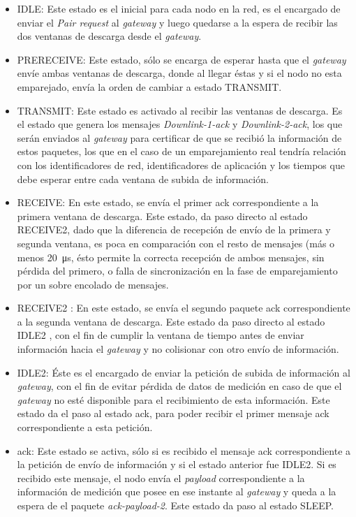 \begin{justify}
\begin{itemize}
\item IDLE: Este estado es el inicial para cada nodo en la red, es el encargado de enviar el \textit{Pair request} al \textit{gateway} y luego quedarse a la espera de recibir las dos ventanas de descarga desde el \textit{gateway}.
\item PRERECEIVE: Este estado, sólo se encarga de esperar hasta que el \textit{gateway} envíe ambas ventanas de descarga, donde al llegar éstas y si el nodo no esta emparejado, envía la orden de cambiar a estado TRANSMIT.
\item TRANSMIT: Este estado es activado al recibir las ventanas de descarga. Es el estado que genera los mensajes \textit{Downlink-1-ack} y \textit{Downlink-2-ack}, los que serán enviados al \textit{gateway} para certificar de que se recibió la información de estos paquetes, los que en el caso de un emparejamiento real tendría relación con los identificadores de red, identificadores de aplicación y los tiempos que debe esperar entre cada ventana de subida de información.
\item RECEIVE: En este estado, se envía el primer \gls{ack} correspondiente a la primera ventana de descarga. Este estado, da paso directo al estado RECEIVE2, dado que la diferencia de recepción de envío de la primera y segunda ventana, es poca en comparación con el resto de mensajes (más o menos \SI{20}{\micro\s}, ésto permite la correcta recepción de ambos mensajes, sin pérdida del primero, o falla de sincronización en la fase de emparejamiento por un sobre encolado de mensajes.
\item RECEIVE2 : En este estado, se envía el segundo paquete \gls{ack} correspondiente a la segunda ventana de descarga. Este estado da paso directo al estado IDLE2 , con el fin de cumplir la ventana de tiempo antes de enviar información hacia el \textit{gateway} y no colisionar con otro envío de información.
\item IDLE2: Éste es el encargado de enviar la petición de subida de información al \textit{gateway}, con el fin de evitar pérdida de datos de medición en caso de que el \textit{gateway} no esté disponible para el recibimiento de esta información. Este estado da el paso al estado \gls{ack}, para poder recibir el primer mensaje \gls{ack} correspondiente a esta petición.
\item \gls{ack}: Este estado se activa, sólo si es recibido el mensaje \gls{ack} correspondiente a la petición de envío de información y si el estado anterior fue IDLE2. Si es recibido este mensaje, el nodo envía el \textit{payload} correspondiente a la información de medición que posee en ese instante al \textit{gateway} y queda a la espera de el paquete \textit{ack-payload-2}. Este estado da paso al estado SLEEP.

\end{itemize}
\end{justify}
